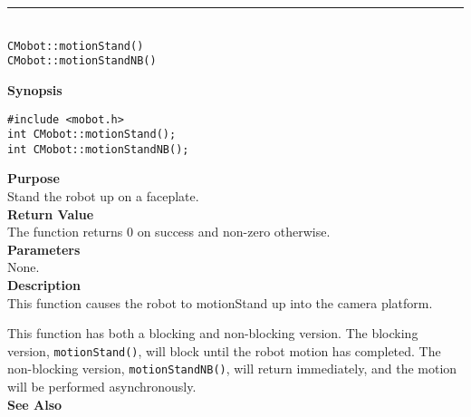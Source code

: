 \noindent
\vspace{5pt}
\rule{4.5in}{0.015in}\\
\noindent
{\LARGE \texttt{CMobot::motionStand()}}\\
{\LARGE \texttt{CMobot::motionStandNB()}}\\
{}

\noindent
{\bf Synopsis}
\begin{verbatim}
#include <mobot.h>
int CMobot::motionStand();
int CMobot::motionStandNB();
\end{verbatim}

\noindent
{\bf Purpose}\\
Stand the robot up on a faceplate.\\

\noindent
{\bf Return Value}\\
The function returns 0 on success and non-zero otherwise.\\

\noindent
{\bf Parameters}\\
None.\\

\noindent
{\bf Description}\\
This function causes the robot to motionStand up into the camera platform.

This function has both a blocking and non-blocking version.
The blocking version, \texttt{motionStand()}, will block until the
robot motion has completed. The non-blocking version, \texttt{motionStandNB()},
will return immediately, and the motion will be performed asynchronously.\\

\noindent
{\bf See Also}\\

